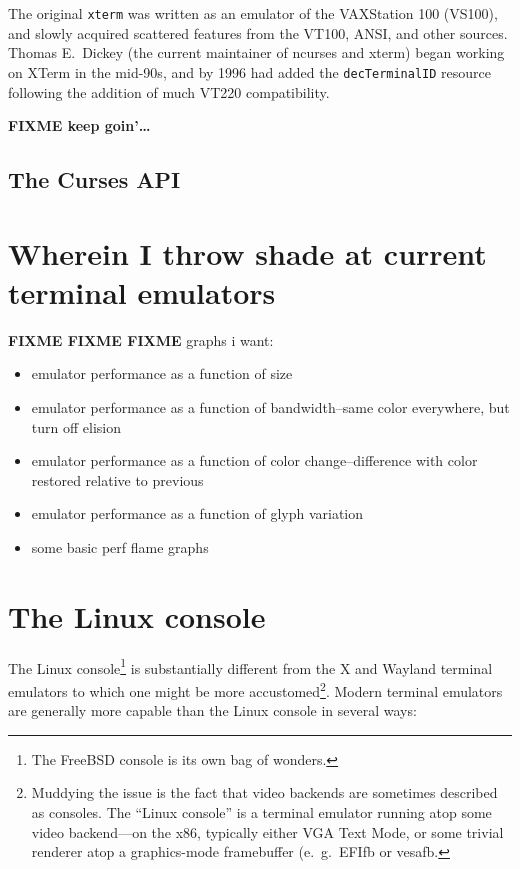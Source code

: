 \documentclass[letterpaper,10pt]{article}
\newenvironment{denseitemize}{
  \begin{itemize}
      \setlength{\itemsep}{0pt}
}{
  \end{itemize}
}
\begin{document}
\begin{appendices}
The original \texttt{xterm} was written as an emulator of the VAXStation 100
(VS100), and slowly acquired scattered features from the VT100, ANSI, and other
sources\cite{xtermfaq}. Thomas E.\ Dickey (the current maintainer of \Gls{ncurses}
and xterm) began working on XTerm in the mid-90s, and by 1996 had added the
\texttt{decTerminalID} resource following the addition of much VT220 compatibility.

\textbf{FIXME keep goin'\ldots}

\subsection{The Curses API}

\newpage
\section{Wherein I throw shade at current terminal emulators}
\label{sec:termshade}
\textbf{FIXME FIXME FIXME}
graphs i want:
\begin{denseitemize}
\item{emulator performance as a function of size}
\item{emulator performance as a function of bandwidth--same color everywhere, but turn off elision}
\item{emulator performance as a function of color change--difference with color restored relative to previous}
\item{emulator performance as a function of glyph variation}
\item{some basic perf flame graphs}
\end{denseitemize}
\newpage

\section{The Linux console}
The Linux console\footnote{The FreeBSD console is its own bag of wonders.} is
substantially different from the X and Wayland terminal emulators to which one
might be more accustomed\footnote{Muddying the issue is the fact that video
backends are sometimes described as consoles. The ``Linux console'' is a terminal
emulator running atop some video backend---on the x86, typically either VGA
Text Mode, or some trivial renderer atop a graphics-mode framebuffer
(e.\ g.\ EFIfb or vesafb.}. Modern terminal emulators are generally more capable
than the Linux console in several ways:


\end{appendices}
\end{document}
